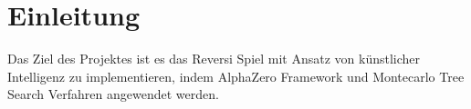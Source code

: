 \section{Einleitung}
Das Ziel des Projektes ist es das Reversi Spiel mit Ansatz von künstlicher Intelligenz zu implementieren, indem AlphaZero Framework und Montecarlo Tree Search Verfahren angewendet werden. 




